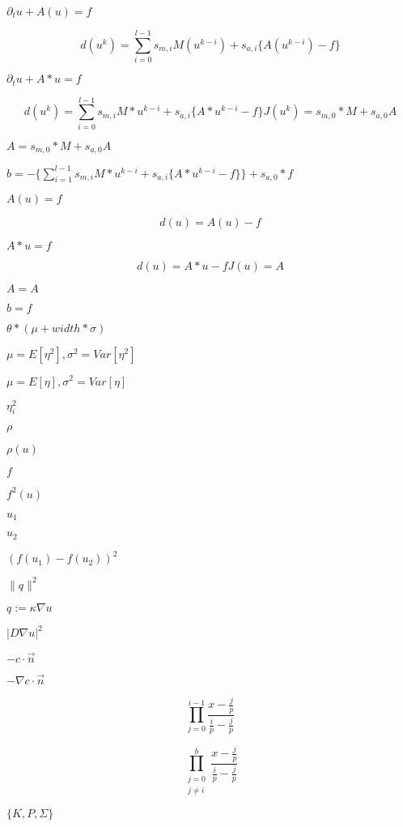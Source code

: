 \documentclass{article}
\begin{document}
$ \partial_t u + A(u) = f $
\pagebreak

\[ d(u^k) = \sum_{i=0}^{l-1} s_{m,i} M(u^{k-i}) + s_{a,i} \{A(u^{k-i}) - f\} \]
\pagebreak

$ \partial_t u + A*u = f $
\pagebreak

\[ d(u^k) = \sum_{i=0}^{l-1} s_{m,i} M*u^{k-i} + s_{a,i} \{A*u^{k-i} - f \} J(u^k) = s_{m,0}*M + s_{a,0} A \]
\pagebreak

$ A = s_{m,0}*M + s_{a,0} A $
\pagebreak

$ b = - \{ \sum_{i=1}^{l-1} s_{m,i} M*u^{k-i} + s_{a,i} \{A*u^{k-i} - f\} \} + s_{a,0} * f $
\pagebreak

$ A(u) = f $
\pagebreak

\[ d(u) = A(u) - f \]
\pagebreak

$ A*u = f $
\pagebreak

\[ d(u) = A*u - f J(u) = A \]
\pagebreak

$ A = A $
\pagebreak

$ b = f $
\pagebreak

$ \theta * (\mu + width * \sigma) $
\pagebreak

$ \mu = E[\eta^2], \sigma^2 = Var[\eta^2] $
\pagebreak

$ \mu = E[\eta], \sigma^2 = Var[\eta] $
\pagebreak

$ \eta_i^2 $
\pagebreak

$\rho$
\pagebreak

$\rho(u)$
\pagebreak

$f$
\pagebreak

$f^2(u)$
\pagebreak

$u_1$
\pagebreak

$u_2$
\pagebreak

$ (f(u_1)- f(u_2))^2 $
\pagebreak

$ \| q \|^2 $
\pagebreak

$ q:= \kappa \nabla u $
\pagebreak

$ |D \nabla u|^2 $
\pagebreak

$ -c \cdot \vec{n} $
\pagebreak

$ - \nabla c \cdot \vec{n} $
\pagebreak

\[ \prod_{j=0}^{i-1} \frac{x - \frac{j}{p}}{\frac{i}{p} - \frac{j}{p}} \]
\pagebreak

\[ \prod_{\substack{j=0\\j\neq i}}^{b} \frac{x - \frac{j}{p}}{\frac{i}{p} - \frac{j}{p}} \]
\pagebreak

$ \{ K, P, \Sigma \} $
\pagebreak
\end{document}
